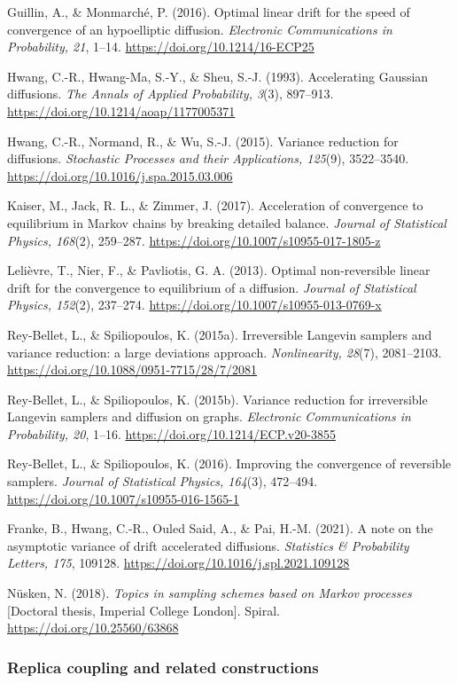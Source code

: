 \documentclass[
  british,
  11pt,
  a4paper,
]{article}
\begin{document}
Guillin, A., \& Monmarché, P. (2016). Optimal linear drift for the speed
of convergence of an hypoelliptic diffusion. \emph{Electronic
Communications in Probability, 21}, 1--14.
\url{https://doi.org/10.1214/16-ECP25}

Hwang, C.-R., Hwang-Ma, S.-Y., \& Sheu, S.-J. (1993). Accelerating
Gaussian diffusions. \emph{The Annals of Applied Probability, 3}(3),
897--913. \url{https://doi.org/10.1214/aoap/1177005371}

Hwang, C.-R., Normand, R., \& Wu, S.-J. (2015). Variance reduction for
diffusions. \emph{Stochastic Processes and their Applications, 125}(9),
3522--3540. \url{https://doi.org/10.1016/j.spa.2015.03.006}

Kaiser, M., Jack, R. L., \& Zimmer, J. (2017). Acceleration of
convergence to equilibrium in Markov chains by breaking detailed
balance. \emph{Journal of Statistical Physics, 168}(2), 259--287.
\url{https://doi.org/10.1007/s10955-017-1805-z}

Lelièvre, T., Nier, F., \& Pavliotis, G. A. (2013). Optimal
non-reversible linear drift for the convergence to equilibrium of a
diffusion. \emph{Journal of Statistical Physics, 152}(2), 237--274.
\url{https://doi.org/10.1007/s10955-013-0769-x}

Rey-Bellet, L., \& Spiliopoulos, K. (2015a). Irreversible Langevin
samplers and variance reduction: a large deviations approach.
\emph{Nonlinearity, 28}(7), 2081--2103.
\url{https://doi.org/10.1088/0951-7715/28/7/2081}

Rey-Bellet, L., \& Spiliopoulos, K. (2015b). Variance reduction for
irreversible Langevin samplers and diffusion on graphs. \emph{Electronic
Communications in Probability, 20}, 1--16.
\url{https://doi.org/10.1214/ECP.v20-3855}

Rey-Bellet, L., \& Spiliopoulos, K. (2016). Improving the convergence of
reversible samplers. \emph{Journal of Statistical Physics, 164}(3),
472--494. \url{https://doi.org/10.1007/s10955-016-1565-1}

Franke, B., Hwang, C.-R., Ouled Said, A., \& Pai, H.-M. (2021). A note
on the asymptotic variance of drift accelerated diffusions.
\emph{Statistics \& Probability Letters, 175}, 109128.
\url{https://doi.org/10.1016/j.spl.2021.109128}

Nüsken, N. (2018). \emph{Topics in sampling schemes based on Markov
processes} {[}Doctoral thesis, Imperial College London{]}. Spiral.
\url{https://doi.org/10.25560/63868}

\subsubsection{Replica coupling and related
constructions}\label{replica-coupling-and-related-constructions}
\end{document}
